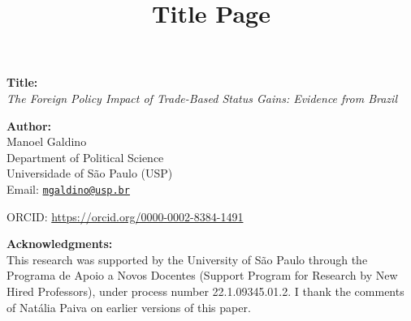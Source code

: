 \documentclass[
  12pt,
]{article}
\title{Title Page}
\author{}
\date{\vspace{-2.5em}}
\begin{document}
\maketitle

\textbf{Title:}\\
\emph{The Foreign Policy Impact of Trade-Based Status Gains: Evidence
from Brazil}

\textbf{Author:}\\
Manoel Galdino\\
Department of Political Science\\
Universidade of São Paulo (USP)\\
Email: \href{mailto:mgaldino@usp.br}{\nolinkurl{mgaldino@usp.br}}

ORCID: \url{https://orcid.org/0000-0002-8384-1491}

\textbf{Acknowledgments:}\\
This research was supported by the University of São Paulo through the
Programa de Apoio a Novos Docentes (Support Program for Research by New
Hired Professors), under process number 22.1.09345.01.2. I thank the
comments of Natália Paiva on earlier versions of this paper.
\end{document}
